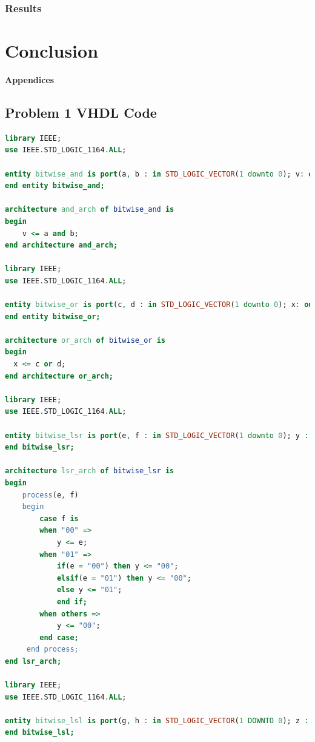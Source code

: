 \documentclass[11pt]{article}
\begin{document}
\subsubsection{Results}


\section{Conclusion}


\pagebreak

\textbf{Appendices}

\begin{appendices}

\section{Problem 1 VHDL Code}

\begin{lstlisting}[language=VHDL]
library IEEE;
use IEEE.STD_LOGIC_1164.ALL;

entity bitwise_and is port(a, b : in STD_LOGIC_VECTOR(1 downto 0); v: out STD_LOGIC_VECTOR(1 downto 0));
end entity bitwise_and;

architecture and_arch of bitwise_and is
begin
    v <= a and b;
end architecture and_arch;

library IEEE;
use IEEE.STD_LOGIC_1164.ALL;

entity bitwise_or is port(c, d : in STD_LOGIC_VECTOR(1 downto 0); x: out STD_LOGIC_VECTOR(1 downto 0));
end entity bitwise_or;

architecture or_arch of bitwise_or is
begin
  x <= c or d;
end architecture or_arch;

library IEEE;
use IEEE.STD_LOGIC_1164.ALL;

entity bitwise_lsr is port(e, f : in STD_LOGIC_VECTOR(1 downto 0); y : out STD_LOGIC_VECTOR(1 downto 0));
end bitwise_lsr;

architecture lsr_arch of bitwise_lsr is
begin
    process(e, f)
    begin
        case f is
        when "00" =>
            y <= e;
        when "01" =>
            if(e = "00") then y <= "00";
            elsif(e = "01") then y <= "00";
            else y <= "01";
            end if;
        when others =>
            y <= "00";
        end case;
     end process;
end lsr_arch;

library IEEE;
use IEEE.STD_LOGIC_1164.ALL;

entity bitwise_lsl is port(g, h : in STD_LOGIC_VECTOR(1 DOWNTO 0); z : out STD_LOGIC_VECTOR(1 downto 0));
end bitwise_lsl;


\end{lstlisting}
\end{appendices}
\end{document}

